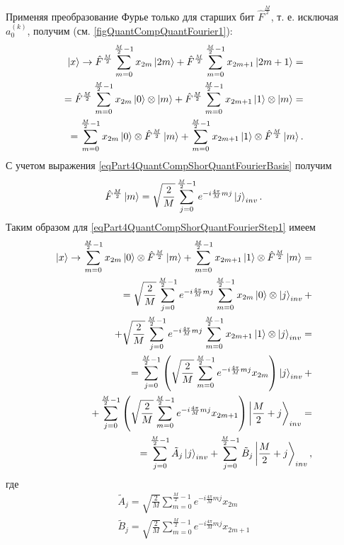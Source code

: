 Применяя преобразование Фурье только для старших бит $\hat{F}^{\frac{M}{2}}$,
т. е. исключая $a^{(k)}_0$, получим (см. \autoref{figQuantCompQuantFourier1}):
\begin{eqnarray}
\ket{x} \rightarrow
\hat{F}^{\frac{M}{2}} \sum_{m = 0}^{\frac{M}{2} - 1}x_{2m} \ket{2m} +
\hat{F}^{\frac{M}{2}} \sum_{m = 0}^{\frac{M}{2} - 1}x_{2m + 1}
\ket{2m+1} = 
\nonumber \\
=
\hat{F}^{\frac{M}{2}} \sum_{m = 0}^{\frac{M}{2} - 1}x_{2m} 
\ket{0} \otimes  \ket{m} +
\hat{F}^{\frac{M}{2}} \sum_{m = 0}^{\frac{M}{2} - 1}x_{2m + 1}
\ket{1} \otimes  \ket{m}
=
\nonumber \\
=
\sum_{m = 0}^{\frac{M}{2} - 1}x_{2m} 
\ket{0} \otimes \hat{F}^{\frac{M}{2}} \ket{m} +
\sum_{m = 0}^{\frac{M}{2} - 1}x_{2m + 1}
\ket{1} \otimes \hat{F}^{\frac{M}{2}} \ket{m}.
\label{eqPart4QuantCompShorQuantFourierStep1}
\end{eqnarray}
С учетом выражения \eqref{eqPart4QuantCompShorQuantFourierBasis} получим
\begin{equation}
\hat{F}^{\frac{M}{2}} \ket{m} = \sqrt{\frac{2}{M}}
\sum_{j= 0}^{\frac{M}{2} - 1} e^{-i \frac{4 \pi}{M} m j}\ket{j}_{inv}.
\nonumber
\end{equation}
Таким образом для \eqref{eqPart4QuantCompShorQuantFourierStep1} имеем
\begin{eqnarray}
\ket{x} \rightarrow
\sum_{m = 0}^{\frac{M}{2} - 1}x_{2m} 
\ket{0} \otimes \hat{F}^{\frac{M}{2}} \ket{m} +
\sum_{m = 0}^{\frac{M}{2} - 1}x_{2m + 1}
\ket{1} \otimes \hat{F}^{\frac{M}{2}} \ket{m} = 
\nonumber \\
=
\sqrt{\frac{2}{M}} \sum_{j = 0}^{\frac{M}{2} - 1} e^{-i \frac{4 \pi}{M} m j} 
\sum_{m = 0}^{\frac{M}{2} - 1}x_{2m} \ket{0} \otimes
\ket{j}_{inv}
+
\nonumber \\
+
\sqrt{\frac{2}{M}} \sum_{j = 0}^{\frac{M}{2} - 1} e^{-i \frac{4 \pi}{M} m j} 
\sum_{m = 0}^{\frac{M}{2} - 1}x_{2m+1} \ket{1} \otimes
\ket{j}_{inv}
=
\nonumber \\
=
\sum_{j = 0}^{\frac{M}{2} - 1}  
\left( \sqrt{\frac{2}{M}} 
\sum_{m = 0}^{\frac{M}{2} - 1} e^{-i \frac{4 \pi}{M} m j} x_{2m} 
\right) \ket{j}_{inv}
+
\nonumber \\
+
\sum_{j = 0}^{\frac{M}{2} - 1}
\left( \sqrt{\frac{2}{M}}  
\sum_{m = 0}^{\frac{M}{2} - 1}e^{-i \frac{4 \pi}{M} m j} x_{2m+1} 
\right)
\left|\frac{M}{2} + j\right>_{inv}
=
\nonumber \\
= \sum^{\frac{M}{2} - 1}_{j = 0}  \tilde{A}_{j} \ket{j}_{inv} +
\sum^{\frac{M}{2} - 1}_{j = 0}  \tilde{B}_{j} \left|\frac{M}{2} + j\right>_{inv},
\nonumber
\end{eqnarray}
где
\begin{eqnarray}
\tilde{A}_{j} = 
\sqrt{\frac{2}{M}} 
\sum_{m = 0}^{\frac{M}{2} - 1} e^{-i \frac{4 \pi}{M} m j} x_{2m} 
\nonumber \\
\tilde{B}_{j} =
\sqrt{\frac{2}{M}} 
\sum_{m = 0}^{\frac{M}{2} - 1} e^{-i \frac{4 \pi}{M} m j} x_{2m+1} 
\label{eqPart4QuantCompShorAB}
\end{eqnarray}

